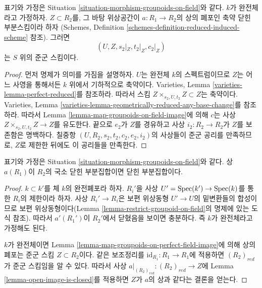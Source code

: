 \begin{lemma}
\label{lemma-map-groupoids-on-perfect-field-image}
표기와 가정은 Situation \ref{situation-morphism-groupoids-on-field}와 같다.
$k$가 완전체라고 가정하자. $Z \subset R_2$를, 그 바탕 위상공간이
$a : R_1 \to R_2$의 상의 폐포인 축약 닫힌 부분스킴이라 하자
(Schemes, Definition \ref{schemes-definition-reduced-induced-scheme} 참조).
그러면
$$
(U, Z, s_2|_Z, t_2|_Z, c_2|_Z)
$$
는 $S$ 위의 준군 스킴이다.
\end{lemma}

\begin{proof}
먼저 명제가 의미를 가짐을 설명하자. $U$는 완전체 $k$의 스펙트럼이므로
$Z$는 어느 사영을 통해서든 $k$ 위에서 기하적으로 축약이다. Varieties, Lemma
\ref{varieties-lemma-perfect-reduced}를 참조하라. 따라서 스킴
$Z \times_{s_2, U, t_2} Z \subset Z$는 축약이다. Varieties, Lemma
\ref{varieties-lemma-geometrically-reduced-any-base-change}를 참조하라.
따라서 Lemma \ref{lemma-map-groupoids-on-field-image}에 의해 $c$는 사상
$Z \times_{s_2, U, t_2} Z \to Z$를 유도한다. 끝으로 $e_2$가 $Z$를
경유하고 사상 $i_2 : R_2 \to R_2$가 $Z$를 보존함은 명백하다. 칠중항
$(U, R_2, s_2, t_2, c_2, e_2, i_2)$의 사상들이 준군 공리를 만족하므로,
$Z$로 제한한 뒤에도 이 공리들을 만족한다.
\end{proof}

\begin{lemma}
\label{lemma-locally-closed-image-is-closed}
표기와 가정은 Situation \ref{situation-morphism-groupoids-on-field}와 같다.
상 $a(R_1)$이 $R_2$의 국소 닫힌 부분집합이면 닫힌 부분집합이다.
\end{lemma}

\begin{proof}
$k \subset k'$를 체 $k$의 완전폐포라 하자. $R_i'$을 사상
$U' = \mathop{\mathrm{Spec}}(k') \to \mathop{\mathrm{Spec}}(k)$를 통한 $R_i$의 제한이라 하자.
사상 $R_i' \to R_i$은 보편 위상동형 $U' \to U$의 밑변환들의 합성이므로
보편 위상동형이다(Lemma \ref{lemma-restrict-groupoid-on-field}의 명제에 있는
도식 참조). 따라서 $a'(R_1')$이 $R_2'$에서 닫혔음을 보이면 충분하다.
즉 $k$가 완전체라고 가정해도 된다.

\medskip\noindent
$k$가 완전체이면 Lemma \ref{lemma-map-groupoids-on-perfect-field-image}에 의해
상의 폐포는 준군 스킴 $Z \subset R_2$이다. 같은 보조정리를
$\text{id}_{R_1} : R_1 \to R_1$에 적용하면 $(R_2)_{red}$가 준군 스킴임을
알 수 있다. 따라서 사상 $a|_{(R_2)_{red}} : (R_2)_{red} \to Z$에 Lemma
\ref{lemma-open-image-is-closed}를 적용하면 $Z$가 $a$의 상과 같다는 결론을 얻는다.
\end{proof}

